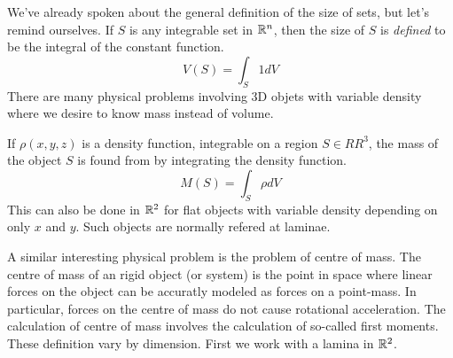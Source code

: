 \documentclass[fleqn,letterpaper]{report}
\begin{document}
We've already spoken about the general definition of the size
of sets, but let's remind ourselves. If $S$ is any integrable
set in $\mathbb{R}^n$, then the size of $S$ is \emph{defined} to be
the integral of the constant function.
\begin{equation*}
V(S) = \int_S 1 dV
\end{equation*}
There are many physical problems involving 3D objets with
variable density where we desire to know mass instead of
volume. 
\begin{defn}
If $\rho(x,y,z)$ is a density function, integrable on a region
$S \in RR^3$, the mass of the object $S$ is found from
by integrating the density function.
\begin{equation*}
M(S) = \int_S \rho dV
\end{equation*}
This can also be done in $\mathbb{R}^2$ for flat objects with variable
density depending on only $x$ and $y$. Such objects are
normally refered at laminae.
\end{defn}

A similar interesting physical problem is the problem of
centre of mass. The centre of mass of an rigid object (or
system) is the point in space where linear forces on the object can
be accuratly modeled as forces on a point-mass. In particular,
forces on the centre of mass do not cause rotational
acceleration. The calculation of centre of mass involves the
calculation of so-called first moments. These definition vary
by dimension. First we work with a lamina in $\mathbb{R}^2$. 
\end{document}
